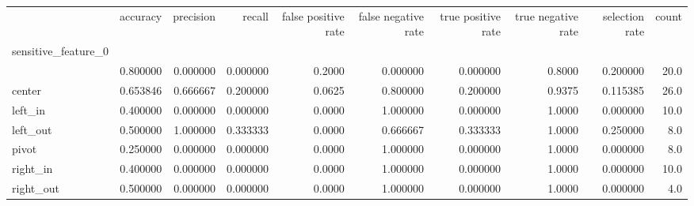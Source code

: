 \begin{tabular}{lrrrrrrrrr}
\toprule
{} &  accuracy &  precision &    recall &  false positive rate &  false negative rate &  true positive rate &  true negative rate &  selection rate &  count \\
sensitive\_feature\_0 &           &            &           &                      &                      &                     &                     &                 &        \\
\midrule
                    &  0.800000 &   0.000000 &  0.000000 &               0.2000 &             0.000000 &            0.000000 &              0.8000 &        0.200000 &   20.0 \\
center              &  0.653846 &   0.666667 &  0.200000 &               0.0625 &             0.800000 &            0.200000 &              0.9375 &        0.115385 &   26.0 \\
left\_in             &  0.400000 &   0.000000 &  0.000000 &               0.0000 &             1.000000 &            0.000000 &              1.0000 &        0.000000 &   10.0 \\
left\_out            &  0.500000 &   1.000000 &  0.333333 &               0.0000 &             0.666667 &            0.333333 &              1.0000 &        0.250000 &    8.0 \\
pivot               &  0.250000 &   0.000000 &  0.000000 &               0.0000 &             1.000000 &            0.000000 &              1.0000 &        0.000000 &    8.0 \\
right\_in            &  0.400000 &   0.000000 &  0.000000 &               0.0000 &             1.000000 &            0.000000 &              1.0000 &        0.000000 &   10.0 \\
right\_out           &  0.500000 &   0.000000 &  0.000000 &               0.0000 &             1.000000 &            0.000000 &              1.0000 &        0.000000 &    4.0 \\
\bottomrule
\end{tabular}
